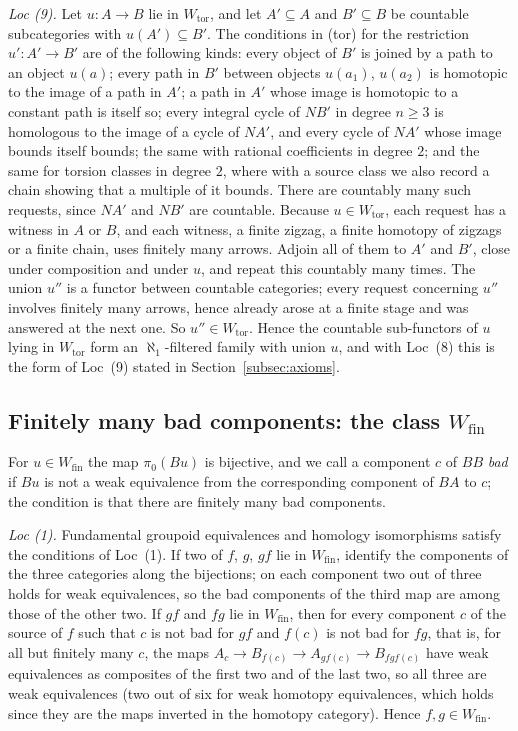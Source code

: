 \documentclass[11pt,a4paper]{article}
\theoremstyle{definition}
\newcommand{\Wtor}{W_{\mathrm{tor}}}
\newcommand{\Wfin}{W_{\mathrm{fin}}}
\begin{document}
\emph{Loc (9).} Let $u\colon A\to B$ lie in $\Wtor$, and let $A'\subseteq A$ and $B'\subseteq B$
be countable subcategories with $u(A')\subseteq B'$. The conditions in (tor) for the
restriction $u'\colon A'\to B'$ are of the following kinds: every object of $B'$ is joined by a
path to an object $u(a)$; every path in $B'$ between objects $u(a_1)$, $u(a_2)$ is homotopic to
the image of a path in $A'$; a path in $A'$ whose image is homotopic to a constant path is itself
so; every integral cycle of $NB'$ in degree $n\ge3$ is homologous to the image of a cycle of
$NA'$, and every cycle of $NA'$ whose image bounds itself bounds; the same with rational
coefficients in degree $2$; and the same for torsion classes in degree $2$, where with a source
class we also record a chain showing that a multiple of it bounds. There are countably many such
requests, since $NA'$ and $NB'$ are countable. Because $u\in\Wtor$, each request has a witness in
$A$ or $B$, and each witness, a finite zigzag, a finite homotopy of zigzags or a finite chain,
uses finitely many arrows. Adjoin all of them to $A'$ and $B'$, close under composition and under
$u$, and repeat this countably many times. The union $u''$ is a functor between countable
categories; every request concerning $u''$ involves finitely many arrows, hence already arose at
a finite stage and was answered at the next one. So $u''\in\Wtor$. Hence the countable
sub-functors of $u$ lying in $\Wtor$ form an $\aleph_1$-filtered family with union $u$, and with
Loc~(8) this is the form of Loc~(9) stated in Section~\ref{subsec:axioms}.

\subsection{Finitely many bad components: the class \texorpdfstring{$\Wfin$}{W fin}}\label{subsec:wfin}

For $u\in\Wfin$ the map $\pi_0(Bu)$ is bijective, and we call a component $c$ of $BB$
\emph{bad} if $Bu$ is not a weak equivalence from the corresponding component of $BA$ to $c$;
the condition is that there are finitely many bad components.

\emph{Loc (1).} Fundamental groupoid equivalences and homology isomorphisms satisfy the
conditions of Loc~(1). If two of $f$, $g$, $gf$ lie in $\Wfin$, identify the components of the
three categories along the bijections; on each component two out of three holds for weak
equivalences, so the bad components of the third map are among those of the other two. If
$gf$ and $fg$ lie in $\Wfin$, then for every component $c$ of the source of $f$ such that
$c$ is not bad for $gf$ and $f(c)$ is not bad for $fg$, that is, for all but finitely many $c$, the maps
$A_c\to B_{f(c)}\to A_{gf(c)}\to B_{fgf(c)}$ have weak equivalences as composites of the first
two and of the last two, so all three are weak equivalences (two out of six for weak homotopy
equivalences, which holds since they are the maps inverted in the homotopy category). Hence
$f,g\in\Wfin$.
\end{document}
